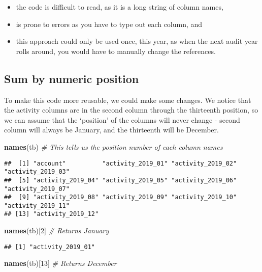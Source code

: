 \documentclass[
]{book}
\newenvironment{Shaded}{\begin{snugshade}}{\end{snugshade}}
\newcommand{\CommentTok}[1]{\textcolor[rgb]{0.56,0.35,0.01}{\textit{#1}}}
\newcommand{\DecValTok}[1]{\textcolor[rgb]{0.00,0.00,0.81}{#1}}
\newcommand{\KeywordTok}[1]{\textcolor[rgb]{0.13,0.29,0.53}{\textbf{#1}}}
\newcommand{\NormalTok}[1]{#1}
\providecommand{\tightlist}{%
  \setlength{\itemsep}{0pt}\setlength{\parskip}{0pt}}
\begin{document}
\begin{itemize}
\tightlist
\item
  the code is difficult to read, as it is a long string of column names,
\item
  is prone to errors as you have to type out each column, and
\item
  this approach could only be used once, this year, as when the next audit year rolls around, you would have to manually change the references.
\end{itemize}

\hypertarget{sum-by-numeric-position}{%
\subsection{Sum by numeric position}\label{sum-by-numeric-position}}

To make this code more reusable, we could make some changes. We notice that the activity columns are in the second column through the thirteenth position, so we can assume that the `position' of the columns will never change - second column will always be January, and the thirteenth will be December.

\begin{Shaded}
\begin{Highlighting}[]
\KeywordTok{names}\NormalTok{(tb) }\CommentTok{# This tells us the position number of each column names}
\end{Highlighting}
\end{Shaded}

\begin{verbatim}
##  [1] "account"          "activity_2019_01" "activity_2019_02" "activity_2019_03"
##  [5] "activity_2019_04" "activity_2019_05" "activity_2019_06" "activity_2019_07"
##  [9] "activity_2019_08" "activity_2019_09" "activity_2019_10" "activity_2019_11"
## [13] "activity_2019_12"
\end{verbatim}

\begin{Shaded}
\begin{Highlighting}[]
\KeywordTok{names}\NormalTok{(tb)[}\DecValTok{2}\NormalTok{] }\CommentTok{# Returns January}
\end{Highlighting}
\end{Shaded}

\begin{verbatim}
## [1] "activity_2019_01"
\end{verbatim}

\begin{Shaded}
\begin{Highlighting}[]
\KeywordTok{names}\NormalTok{(tb)[}\DecValTok{13}\NormalTok{] }\CommentTok{# Returns December}
\end{Highlighting}
\end{Shaded}
\end{document}
